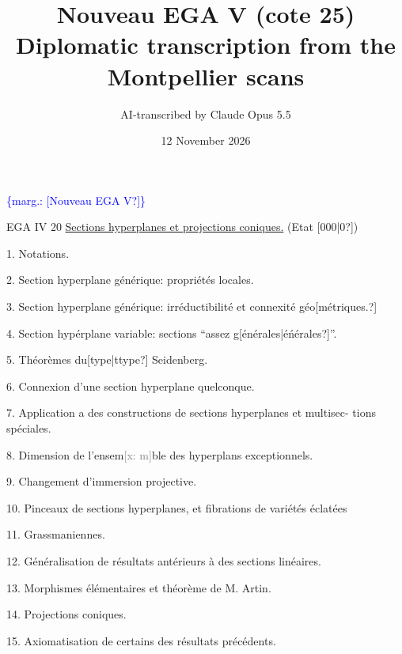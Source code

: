 \documentclass[11pt]{article}
\title{Nouveau EGA V (cote 25)\\[4pt]\large Diplomatic transcription from the Montpellier scans}
\author{AI-transcribed by Claude Opus 5.5}
\date{12 November 2026}
\newcommand{\scanpage}[1]{\par\bigskip\noindent{\small\sffamily[scan #1]}\par}
\newcommand{\mspage}[1]{{\small\sffamily[p.\,#1]}}
\newcommand{\margin}[1]{\textcolor{blue}{\{\textsf{marg.:} #1\}}}
\newcommand{\xout}[1]{\textcolor{gray}{[\textsf{x:} #1]}}
\newcommand{\uline}[1]{\underline{#1}}
\newcommand{\unsure}[1]{[#1?]}
\begin{document}
\maketitle

\scanpage{25/1}
\mspage{1}

\clearpage
\scanpage{25/2}
\margin{\unsure{Nouveau EGA V}} \mspage{0}

EGA IV 20 \quad \uline{Sections hyperplanes et projections coniques.} (Etat \unsure{000|0})

1. Notations.

2. Section hyperplane générique: propriétés locales.

3. Section hyperplane générique: irréductibilité et connexité géo\unsure{métriques.}

4. Section hypérplane variable: sections ``assez g\unsure{énérales|éńérales}''.

5. Théorèmes du\unsure{type|ttype} Seidenberg.

6. Connexion d'une section hyperplane quelconque.

7. Application a des constructions de sections hyperplanes et multisec-%
tions spéciales.

8. Dimension de l'ensem\xout{m}ble  des hyperplans exceptionnels.

9. Changement d'immersion projective.

10. Pinceaux de sections hyperplanes, et fibrations de variétés éclatées

11. Grassmaniennes.

12. Généralisation de résultats antérieurs à des sections linéaires.

13. Morphismes élémentaires et théorème de M. Artin.

14. Projections coniques.

15. Axiomatisation de certains des résultats précédents.
\end{document}
